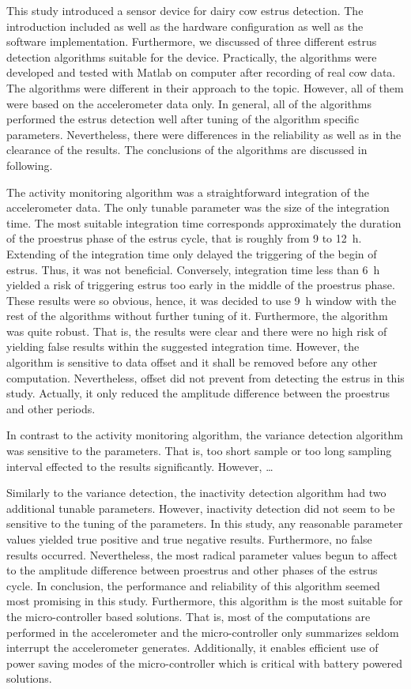 \documentclass[english,12pt,a4paper,pdftex,elec,utf8]{aaltothesis}
\begin{document}
This study introduced a sensor device for dairy cow estrus detection. The introduction included as well as the hardware configuration as well as the software implementation. Furthermore, we discussed of three different estrus detection algorithms suitable for the device. Practically, the algorithms were developed and tested with Matlab on computer after recording of real cow data. The algorithms were different in their approach to the topic. However, all of them were based on the accelerometer data only. In general, all of the algorithms performed the estrus detection well after tuning of the algorithm specific parameters. Nevertheless, there were differences in the reliability as well as in the clearance of the results. The conclusions of the algorithms are discussed in following.

The activity monitoring algorithm was a straightforward integration of the accelerometer data. The only tunable parameter was the size of the integration time. The most suitable integration time corresponds approximately the duration of the proestrus phase of the estrus cycle, that is roughly from 9 to \SI{12}{\hour}. Extending of the integration time only delayed the triggering of the begin of estrus. Thus, it was not beneficial. Conversely, integration time less than \SI{6}{\hour} yielded a risk of triggering estrus too early in the middle of the proestrus phase. These results were so obvious, hence, it was decided to use \SI{9}{\hour} window with the rest of the algorithms without further tuning of it. Furthermore, the algorithm was quite robust. That is, the results were clear and there were no high risk of yielding false results within the suggested integration time. However, the algorithm is sensitive to data offset and it shall be removed before any other computation. Nevertheless, offset did not prevent from detecting the estrus in this study. Actually, it only reduced the amplitude difference between the proestrus and other periods.

In contrast to the activity monitoring algorithm, the variance detection algorithm was sensitive to the parameters. That is, too short sample or too long sampling interval effected to the results significantly. However, \dots

Similarly to the variance detection, the inactivity detection algorithm had two additional tunable parameters. However, inactivity detection did not seem to be sensitive to the tuning of the parameters. In this study, any reasonable parameter values yielded true positive and true negative results. Furthermore, no false results occurred. Nevertheless,  the most radical parameter values begun to affect to the amplitude difference between proestrus and other phases of the estrus cycle. In conclusion, the performance and reliability of this algorithm seemed most promising in this study. Furthermore, this algorithm is the most suitable for the micro-controller based solutions. That is, most of the computations are performed in the accelerometer and the micro-controller only summarizes seldom interrupt the accelerometer generates. Additionally, it enables efficient use of power saving modes of the micro-controller which is critical with battery powered solutions. 
\end{document}
